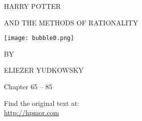 



\begin{center}
\thispagestyle{empty}
{\hp
\Huge\MakeUppercase{Harry Potter}\vspace*{0.5cm}

\Large\MakeUppercase{and the Methods of Rationality} %
 
\texttt{[image: bubble0.png]} 

\Large BY \vspace*{.25cm}

\huge ELIEZER YUDKOWSKY%

\normalsize

\vspace*{1\baselineskip}
}

Chapter 65 -- 85

\vspace{3cm}
Find the original text at:\\
\url{http://hpmor.com} \\

\end{center}

